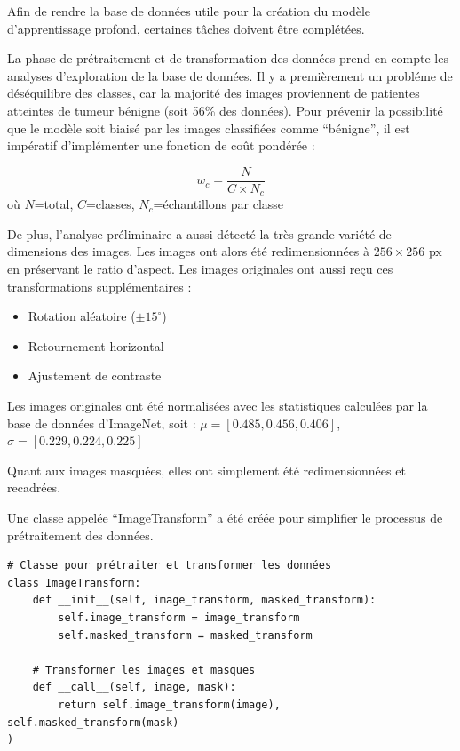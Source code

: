 \documentclass[a4paper,12pt]{article}
\begin{document}
Afin de rendre la base de données utile pour la création du modèle d'apprentissage profond, certaines tâches doivent être complétées.

La phase de prétraitement et de transformation des données prend en compte les analyses d'exploration de la base de données. Il y a premièrement un probléme de déséquilibre des classes, car la majorité des images proviennent de patientes atteintes de tumeur bénigne (soit 56\% des données). Pour prévenir la possibilité que le modèle soit biaisé par les images classifiées comme \enquote{bénigne}, il est impératif d'implémenter une fonction de coût pondérée :

\begin{equation}
        w_c = \frac{N}{C \times N_c}
    \end{equation}
où $N$=total, $C$=classes, $N_c$=échantillons par classe

De plus, l'analyse préliminaire a aussi détecté la très grande variété de dimensions des images. Les images ont alors été redimensionnées à $256\times256$ px en préservant le ratio d'aspect. Les images originales ont aussi reçu ces transformations supplémentaires :

\begin{itemize}
        \item Rotation aléatoire ($\pm15^\circ$)
        \item Retournement horizontal
        \item Ajustement de contraste
\end{itemize}

Les images originales ont été normalisées avec les statistiques calculées par la base de données d'ImageNet, soit : $\mu=[0.485,0.456,0.406]$, $\sigma=[0.229,0.224,0.225]$

Quant aux images masquées, elles ont simplement été redimensionnées et recadrées.

Une classe appelée \enquote{ImageTransform} a été créée pour simplifier le processus de prétraitement des données.

\begin{verbatim}
# Classe pour prétraiter et transformer les données
class ImageTransform:
    def __init__(self, image_transform, masked_transform):
        self.image_transform = image_transform
        self.masked_transform = masked_transform

    # Transformer les images et masques
    def __call__(self, image, mask):
        return self.image_transform(image), self.masked_transform(mask)
)
\end{verbatim}
\end{document}
